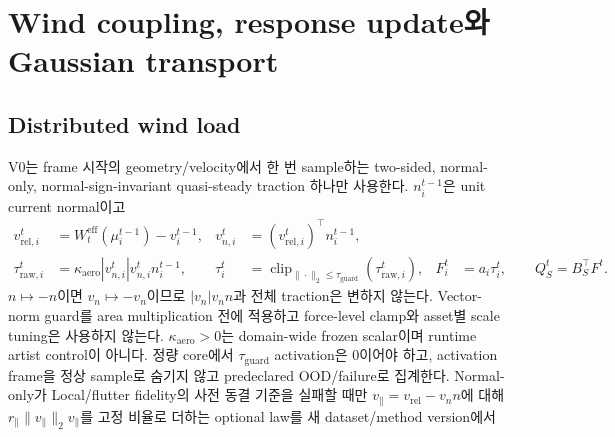 \documentclass[11pt]{article}
\begin{document}
\section{Wind coupling, response update와 Gaussian transport}

\subsection{Distributed wind load}

V0는 frame 시작의 geometry/velocity에서 한 번 sample하는 two-sided, normal-only,
normal-sign-invariant quasi-steady traction 하나만 사용한다. \(n_i^{t-1}\)은 unit current normal이고
\begin{equation}
  \begin{aligned}
  v_{\mathrm{rel},i}^{t}
    &=W_t^{\mathrm{eff}}(\mu_i^{t-1})-v_i^{t-1},
    &v_{n,i}^{t}&=(v_{\mathrm{rel},i}^{t})^\top n_i^{t-1},\\
  \tau_{\mathrm{raw},i}^{t}
    &=\kappa_{\mathrm{aero}}|v_{n,i}^{t}|v_{n,i}^{t}n_i^{t-1},
    &\tau_i^t&=\operatorname{clip}_{\|\cdot\|_2\le\tau_{\mathrm{guard}}}
    (\tau_{\mathrm{raw},i}^{t}),
    &F_i^t&=a_i\tau_i^t,\qquad Q_S^t=B_S^\top F^t .
  \end{aligned}
  \label{eq:rd-wind-pullback}
\end{equation}
\(n\mapsto-n\)이면 \(v_n\mapsto-v_n\)이므로
\(|v_n|v_n n\)과 전체 traction은 변하지 않는다. Vector-norm guard를
area multiplication 전에 적용하고 force-level clamp와 asset별 scale tuning은 사용하지 않는다.
\(\kappa_{\mathrm{aero}}>0\)는 domain-wide frozen scalar이며 runtime artist control이 아니다.
정량 core에서 \(\tau_{\mathrm{guard}}\) activation은 0이어야 하고, activation frame을 정상 sample로 숨기지 않고
predeclared OOD/failure로 집계한다. Normal-only가 Local/flutter fidelity의 사전 동결 기준을 실패할 때만
\(v_{\parallel}=v_{\mathrm{rel}}-v_n n\)에 대해
\(r_{\parallel}\|v_{\parallel}\|_2v_{\parallel}\)를 고정 비율로 더하는 optional law를 새 dataset/method version에서
\end{document}
